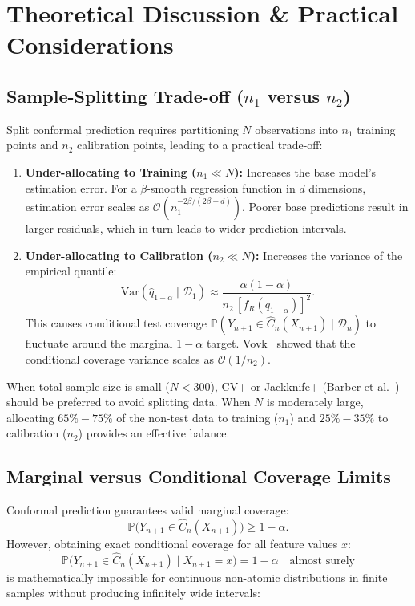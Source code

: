\documentclass[journal]{IEEEtran}
\begin{document}
\section{Theoretical Discussion \& Practical Considerations}\label{sec:discussion}

\subsection{Sample-Splitting Trade-off ($n_1$ versus $n_2$)}
Split conformal prediction requires partitioning $N$ observations into $n_1$ training points and $n_2$ calibration points, leading to a practical trade-off:
\begin{enumerate}
    \item \textbf{Under-allocating to Training ($n_1 \ll N$):} Increases the base model's estimation error. For a $\beta$-smooth regression function in $d$ dimensions, estimation error scales as $\mathcal{O}(n_1^{-2\beta / (2\beta + d)})$. Poorer base predictions result in larger residuals, which in turn leads to wider prediction intervals.
    \item \textbf{Under-allocating to Calibration ($n_2 \ll N$):} Increases the variance of the empirical quantile:
    \begin{equation}
    \text{Var}(\hat{q}_{1-\alpha} \mid \mathcal{D}_1) \approx \frac{\alpha(1 - \alpha)}{n_2 \, [f_R(q_{1-\alpha})]^2}.
    \end{equation}
    This causes conditional test coverage $\mathbb{P}(Y_{n+1} \in \hat{C}_n(X_{n+1}) \mid \mathcal{D}_n)$ to fluctuate around the marginal $1 - \alpha$ target. Vovk~\cite{vovk2012} showed that the conditional coverage variance scales as $\mathcal{O}(1/n_2)$.
\end{enumerate}

When total sample size is small ($N < 300$), CV+ or Jackknife+ (Barber et al.~\cite{barber2021}) should be preferred to avoid splitting data. When $N$ is moderately large, allocating $65\% - 75\%$ of the non-test data to training ($n_1$) and $25\% - 35\%$ to calibration ($n_2$) provides an effective balance.

\subsection{Marginal versus Conditional Coverage Limits}
Conformal prediction guarantees valid marginal coverage:
\begin{equation}
\mathbb{P}\big(Y_{n+1} \in \hat{C}_n(X_{n+1})\big) \ge 1 - \alpha.
\end{equation}
However, obtaining exact conditional coverage for all feature values $x$:
\begin{equation}
\mathbb{P}\big(Y_{n+1} \in \hat{C}_n(X_{n+1}) \mid X_{n+1} = x\big) = 1 - \alpha \quad \text{almost surely}
\end{equation}
is mathematically impossible for continuous non-atomic distributions in finite samples without producing infinitely wide intervals:
\end{document}

